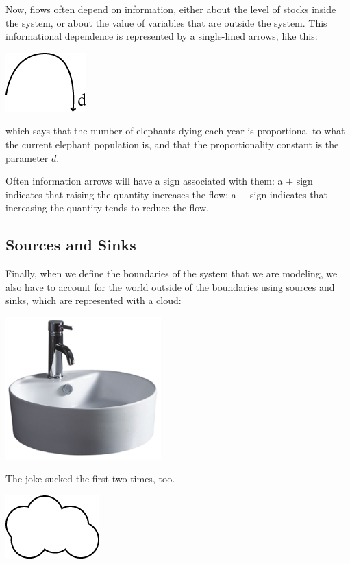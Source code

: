 Now, flows often depend on information, either about the level of stocks inside the system, or about the value of variables that are outside the system.  This informational dependence is represented by a single-lined arrows, like this:

\beforefig
\centerline{\includegraphics[height=.5in]{figs/Information}} 
\afterfig

which says that the number of elephants dying each year is proportional to what the current elephant population is, and that the proportionality constant is the parameter $d$.

Often information arrows will have a sign associated with them: a $+$ sign indicates that raising the quantity increases the flow; a $-$ sign indicates that increasing the quantity tends to reduce the flow.  

\subsection{Sources and Sinks}
Finally, when we define the boundaries of the system that we are modeling, we also have to account for the world outside of the boundaries using sources and sinks, which are represented with a cloud:

\begin{marginfigure}
\includegraphics[width=6cm]{figs/bathroomsink}
\caption{The joke sucked the first two times, too.}
\end{marginfigure}

\beforefig
\centerline{\includegraphics[height=.5in]{figs/sink}}
\afterfig


